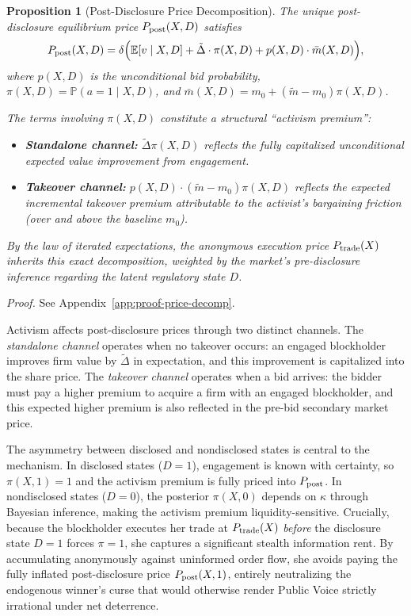 \documentclass[11pt]{article}
\newtheorem{proposition}{Proposition}
\newcommand{\E}{\mathbb{E}}
\newcommand{\PP}{\mathbb{P}}
\newcommand{\1}{\mathbf{1}}
\begin{document}
\begin{proposition}[Post-Disclosure Price Decomposition]
\label{prop:price-decomp}
The unique post-disclosure equilibrium price $P_{\textup{post}}(X,D)$ satisfies
\[
P_{\textup{post}}(X,D) = \delta\Big(\E[v \mid X,D] + \tilde{\Delta} \cdot \pi(X,D) + p(X,D) \cdot \bar{m}(X,D)\Big),
\]
where $p(X,D)$ is the unconditional bid probability, $\pi(X,D) = \PP(a=1 \mid X,D)$, and $\bar{m}(X,D) = m_0 + (\tilde{m} - m_0)\pi(X,D)$.

The terms involving $\pi(X,D)$ constitute a structural ``activism premium'':
\begin{itemize}[leftmargin=1.5em,itemsep=0pt]
\item \textbf{Standalone channel:} $\tilde{\Delta}\pi(X,D)$ reflects the fully capitalized unconditional expected value improvement from engagement.
\item \textbf{Takeover channel:} $p(X,D) \cdot (\tilde{m}-m_0)\pi(X,D)$ reflects the expected \emph{incremental} takeover premium attributable to the activist's bargaining friction (over and above the baseline $m_0$).
\end{itemize}
By the law of iterated expectations, the anonymous execution price $P_{\textup{trade}}(X)$ inherits this exact decomposition, weighted by the market's pre-disclosure inference regarding the latent regulatory state $D$.
\end{proposition}
\textit{Proof.} See Appendix~\ref{app:proof-price-decomp}.

Activism affects post-disclosure prices through two distinct channels. The \emph{standalone channel} operates when no takeover occurs: an engaged blockholder improves firm value by $\tilde{\Delta}$ in expectation, and this improvement is capitalized into the share price. The \emph{takeover channel} operates when a bid arrives: the bidder must pay a higher premium to acquire a firm with an engaged blockholder, and this expected higher premium is also reflected in the pre-bid secondary market price.

The asymmetry between disclosed and nondisclosed states is central to the mechanism. In disclosed states ($D=1$), engagement is known with certainty, so $\pi(X,1)=1$ and the activism premium is fully priced into $P_{\textup{post}}$. In nondisclosed states ($D=0$), the posterior $\pi(X,0)$ depends on $\kappa$ through Bayesian inference, making the activism premium liquidity-sensitive. Crucially, because the blockholder executes her trade at $P_{\textup{trade}}(X)$ \emph{before} the disclosure state $D=1$ forces $\pi=1$, she captures a significant stealth information rent. By accumulating anonymously against uninformed order flow, she avoids paying the fully inflated post-disclosure price $P_{\textup{post}}(X,1)$, entirely neutralizing the endogenous winner's curse that would otherwise render Public Voice strictly irrational under net deterrence.
\end{document}

